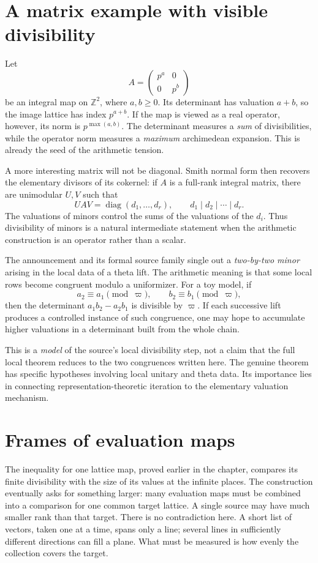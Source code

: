 \documentclass[11pt,openany,oneside]{scrbook}
\theoremstyle{definition}
\theoremstyle{remark}
\newcommand{\ZZ}{\mathbb Z}
\begin{document}
\section{A matrix example with visible divisibility}

Let
\[
A=\begin{pmatrix}p^a&0\\0&p^b\end{pmatrix}
\]
be an integral map on $\ZZ^2$, where $a,b\ge0$. Its determinant has valuation $a+b$, so the image lattice has index $p^{a+b}$. If the map is viewed as a real operator, however, its norm is $p^{\max(a,b)}$. The determinant measures a \emph{sum} of divisibilities, while the operator norm measures a \emph{maximum} archimedean expansion. This is already the seed of the arithmetic tension.

A more interesting matrix will not be diagonal. Smith normal form then recovers the elementary divisors of its cokernel: if $A$ is a full-rank integral matrix, there are unimodular $U,V$ such that
\[
UAV=\operatorname{diag}(d_1,\ldots,d_r),
\qquad d_1\mid d_2\mid\cdots\mid d_r.
\]
The valuations of minors control the sums of the valuations of the $d_i$. Thus divisibility of minors is a natural intermediate statement when the arithmetic construction is an operator rather than a scalar.

The announcement and its formal source family single out a \emph{two-by-two minor} arising in the local data of a theta lift. The arithmetic meaning is that some local rows become congruent modulo a uniformizer. For a toy model, if
\[
a_2\equiv a_1\pmod{\varpi},\qquad
b_2\equiv b_1\pmod{\varpi},
\]
then the determinant $a_1b_2-a_2b_1$ is divisible by $\varpi$. If each successive lift produces a controlled instance of such congruence, one may hope to accumulate higher valuations in a determinant built from the whole chain.

This is a \emph{model} of the source's local divisibility step, not a claim that the full local theorem reduces to the two congruences written here. The genuine theorem has specific hypotheses involving local unitary and theta data. Its importance lies in connecting representation-theoretic iteration to the elementary valuation mechanism.

\section{Frames of evaluation maps}\label{sec:frame}

The inequality for one lattice map, proved earlier in the chapter, compares its finite divisibility with the size of its values at the infinite places.  The construction eventually asks for something larger: many evaluation maps must be combined into a comparison for one common target lattice.  A single source may have much smaller rank than that target.  There is no contradiction here.  A short list of vectors, taken one at a time, spans only a line; several lines in sufficiently different directions can fill a plane.  What must be measured is how evenly the collection covers the target.
\end{document}
